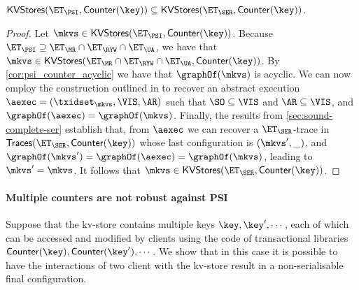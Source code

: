 \begin{corollary}
$\mathsf{KVStores}(\ET_{\PSI}, \mathsf{Counter}(\key)) \subseteq \mathsf{KVStores}(\ET_{\SER}, \mathsf{Counter}(\key))$. 
\end{corollary}

\begin{proof}
Let $\mkvs \in \mathsf{KVStores}(\ET_{\PSI}, \mathsf{Counter}(\key))$. Because $\ET_{\PSI} \supseteq \ET_{\MR} \cap \ET_{\RYW} \cap \ET_{\UA}$, 
we have that $\mkvs \in \mathsf{KVStores}(\ET_{\MR} \cap \ET_{\RYW} \cap \ET_{\UA}, \mathsf{Counter}(\key))$. 
By \cref{cor:psi_counter_acyclic} we have that $\graphOf(\mkvs)$ is acyclic. We can now employ the construction 
outlined in \cite{laws} to recover an abstract execution $\aexec = (\txidset_{\mkvs}, \VIS, \AR)$ such that $\SO \subseteq \VIS$ and $\AR \subseteq \VIS$, 
and $\graphOf(\aexec) = \graphOf(\mkvs)$.
Finally, the results from \cref{sec:sound-complete-ser} establish that, from $\aexec$ we can recover a $\ET_{\SER}$-trace in 
$\mathsf{Traces}(\ET_{\SER}, \mathsf{Counter}(\key))$ 
whose last configuration is $(\mkvs', \_)$, and 
$\graphOf(\mkvs') = \graphOf(\aexec) = \graphOf(\mkvs)$, leading to $\mkvs' = \mkvs$. It follows that $\mkvs \in 
\mathsf{KVStores}(\ET_{\SER}, \mathsf{Counter}(\key))$.
\end{proof}

\paragraph{Multiple counters are not robust against PSI}
Suppose that the kv-store contains multiple keys $\key, \key', \cdots$, each of which 
can be accessed and modified by clients using the code of transactional libraries 
$\mathsf{Counter}(\key), \mathsf{Counter}(\key'), \cdots$. We show that in this
 case it is possible to have the interactions of two client with the kv-store result 
 in  a non-serialisable final configuration. 
 
